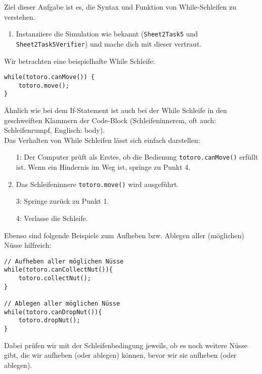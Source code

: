 

Ziel dieser Aufgabe ist es, die Syntax und  Funktion von While-Schleifen zu verstehen.

\begin{enumerate}
    \item Instanziiere die Simulation wie bekannt (\lstinline{Sheet2Task5} und \lstinline{Sheet2Task5Verifier}) und mache dich mit dieser vertraut.
\end{enumerate}


\begin{Infobox}
    Wir betrachten eine beispielhafte While Schleife:

    \begin{lstlisting}[breaklines=true, numbers=none]
while(totoro.canMove()) {
    totoro.move();
}
    \end{lstlisting}

    Ähnlich wie bei dem If-Statement ist auch bei der While Schleife in den geschweiften Klammern der Code-Block (Schleifeninnerem, oft auch: Schleifenrumpf, Englisch: body).\\

    Das Verhalten von While Schleifen lässt sich einfach darstellen:
    \begin{enumerate}
        \item[1:] Der Computer prüft als Erstes, ob die Bedienung \lstinline{totoro.canMove()} erfüllt ist. 
        Wenn ein Hindernis im Weg ist, springe zu Punkt 4.
        \item[2:] Das Schleifeninnere \lstinline{totoro.move()} wird ausgeführt.
        \item[3:] Springe zurück zu Punkt 1.
        \item[4:] Verlasse die Schleife.
    \end{enumerate}

    Ebenso sind folgende Beispiele zum Aufheben bzw. Ablegen aller (möglichen) Nüsse hilfreich:

    \begin{lstlisting}[breaklines=true, numbers=none]
// Aufheben aller möglichen Nüsse
while(totoro.canCollectNut()){
    totoro.collectNut();
}

// Ablegen aller möglichen Nüsse
while(totoro.canDropNut()){
    totoro.dropNut();
}
    \end{lstlisting}

    Dabei prüfen wir mit der Schleifenbedingung jeweils, ob es noch weitere Nüsse gibt, die wir aufheben (oder ablegen) können, bevor wir sie aufheben (oder ablegen).
\end{Infobox}


